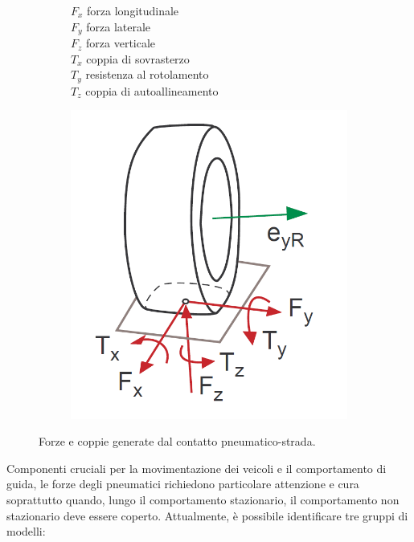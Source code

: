 \begin{figure}[h]
	\centering
	\begin{subfigure}{0.4\linewidth}
		$F_x$ \quad forza longitudinale\\
		$F_y$ \quad forza laterale\\
		$F_z$ \quad forza verticale\\
		$T_x$ \quad coppia di sovrasterzo\\
		$T_y$ \quad resistenza al rotolamento\\
		$T_z$ \quad coppia di autoallineamento
	\end{subfigure}
	\begin{subfigure}{0.4\linewidth}
		\centering
		\includegraphics[width=\linewidth]{Figures/tire_forces}
	\end{subfigure}
\caption{Forze e coppie generate dal contatto pneumatico-strada.}
\label{tireforces}
\end{figure}
%
Componenti cruciali per la movimentazione dei veicoli e il comportamento di guida, le forze degli pneumatici richiedono particolare attenzione e cura soprattutto quando, lungo il comportamento stazionario, il comportamento non stazionario deve essere coperto. Attualmente, è possibile identificare tre gruppi di modelli:
